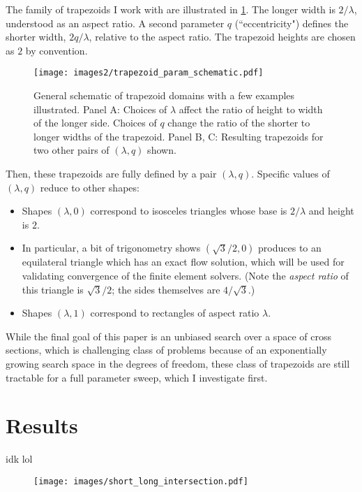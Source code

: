 \documentclass{amsart}
\begin{document}
The family of trapezoids I work with are illustrated in \ref{fig:TRAP_SCHEMATIC}. 
The longer width is $2/\lambda$, understood as an aspect ratio. A 
second parameter $q$ (``eccentricity") defines the shorter width, $2q/\lambda$, 
relative to the aspect ratio. The trapezoid heights are chosen as $2$ by convention. 
%
\begin{figure}
\texttt{[image: images2/trapezoid\_param\_schematic.pdf]}
\caption{General schematic of trapezoid domains with a few examples illustrated. 
Panel A: Choices of $\lambda$ affect the ratio of height to width of the longer side. 
Choices of $q$ change the ratio of the shorter to longer widths of the trapezoid. 
Panel B, C: Resulting trapezoids for two other pairs of $(\lambda,q)$ shown.}
\label{fig:TRAP_SCHEMATIC}
\end{figure}
%
Then, these trapezoids are fully defined by a pair $(\lambda,q)$. 
Specific values of $(\lambda,q)$ reduce to other shapes:
%
\begin{itemize}
\item Shapes $(\lambda,0)$ correspond to isosceles triangles whose base is 
$2/\lambda$ and height is $2$.
\item In particular, a bit of trigonometry shows 
$(\sqrt{3}/2, 0)$ produces to an equilateral triangle which 
has an exact flow solution, which will be used for validating convergence of 
the finite element solvers. (Note the \emph{aspect ratio} of this triangle 
is $\sqrt{3}/2$; the sides themselves are $4/\sqrt{3}$.)
\item Shapes $(\lambda,1)$ correspond to rectangles of aspect ratio $\lambda$.
\end{itemize}
%
While the final goal of this paper is an unbiased search over a space of cross sections, 
which is challenging class of problems because of an exponentially growing 
search space in the degrees of freedom, these class of trapezoids are still 
tractable for a full parameter sweep, which I investigate first.

\section{Results}
idk lol

\begin{figure}
\texttt{[image: images/short\_long\_intersection.pdf]}
\end{figure}
\end{document}
